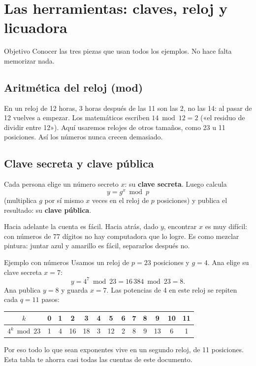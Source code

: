 \documentclass[11pt,a4paper]{article}
\theoremstyle{definition}
\theoremstyle{plain}
\theoremstyle{remark}
\begin{document}
\section{Las herramientas: claves, reloj y licuadora}\label{sec:claves}

\begin{nota}{Objetivo}
Conocer las tres piezas que usan todos los ejemplos. No hace falta memorizar nada.
\end{nota}

\subsection{Aritmética del reloj (mod)}

En un reloj de 12 horas, 3 horas después de las 11 son las 2, no las 14: al pasar
de 12 vuelves a empezar. Los matemáticos escriben $14 \bmod 12 = 2$ («el residuo de
dividir entre 12»). Aquí usaremos relojes de otros tamaños, como 23 u 11
posiciones. Así los números nunca crecen demasiado.

\subsection{Clave secreta y clave pública}

Cada persona elige un número secreto $x$: su \textbf{clave secreta}. Luego calcula
\[
  y = g^{x} \bmod p
\]
(multiplica $g$ por sí mismo $x$ veces en el reloj de $p$ posiciones) y publica el
resultado: su \textbf{clave pública}.

Hacia adelante la cuenta es fácil. Hacia atrás, dado $y$, encontrar $x$ es muy
difícil: con números de 77 dígitos no hay computadora que lo logre. Es como mezclar
pintura: juntar azul y amarillo es fácil, separarlos después no.

\begin{caso}{Ejemplo con números}
Usamos un reloj de $p = 23$ posiciones y $g = 4$. Ana elige su clave secreta $x = 7$:
\[
  y = 4^{7} \bmod 23 = 16\,384 \bmod 23 = 8 .
\]
Ana publica $y = 8$ y guarda $x = 7$. Las potencias de 4 en este reloj se repiten
cada $q = 11$ pasos:
\begin{center}\small
\begin{tabular}{@{}c*{12}{c}@{}}
\toprule
$k$ & 0 & 1 & 2 & 3 & 4 & 5 & 6 & 7 & 8 & 9 & 10 & 11 \\
\midrule
$4^{k} \bmod 23$ & 1 & 4 & 16 & 18 & 3 & 12 & 2 & 8 & 9 & 13 & 6 & 1 \\
\bottomrule
\end{tabular}
\end{center}
Por eso todo lo que sean exponentes vive en un segundo reloj, de 11 posiciones.
Esta tabla te ahorra casi todas las cuentas de este documento.
\end{caso}
\end{document}

